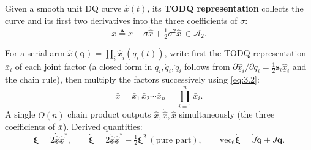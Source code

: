 Given a smooth unit DQ curve $\hat{\underline x}(t)$, its \textbf{TODQ representation} collects the curve and its first two derivatives into the three coefficients of $\sigma$:
\begin{equation}
\bar x\triangleq\hat{\underline x}+\sigma\dot{\hat{\underline x}}+\tfrac12\sigma^2\ddot{\hat{\underline x}}\ \in\mathcal A_2 .
\tag{3.3a}\label{eq:3.3a}
\end{equation}

For a serial arm $\hat{\underline x}(\boldsymbol q)=\prod_i\hat{\underline x}_i(q_i(t))$, write first the TODQ representation $\bar x_i$ of each joint factor (a closed form in $q_i,\dot q_i,\ddot q_i$ follows from $\partial\hat{\underline x}_i/\partial q_i=\tfrac12\boldsymbol s_i\hat{\underline x}_i$ and the chain rule), then multiply the factors successively using \eqref{eq:3.2}:
\begin{equation}
\bar x=\bar x_1\,\bar x_2\cdots\bar x_n=\prod_{i=1}^{n}\bar x_i .
\tag{3.4}\label{eq:3.4}
\end{equation}
A single $O(n)$ chain product outputs $\hat{\underline x},\dot{\hat{\underline x}},\ddot{\hat{\underline x}}$ simultaneously (the three coefficients of $\bar x$). Derived quantities:
\begin{equation}
\boldsymbol\xi=2\dot{\hat{\underline x}}\hat{\underline x}^*,\qquad
\dot{\boldsymbol\xi}=2\ddot{\hat{\underline x}}\hat{\underline x}^*-\tfrac12\boldsymbol\xi^2\ (\text{pure part}),\qquad
\mathrm{vec}_6\dot{\boldsymbol\xi}=\dot J\dot{\boldsymbol q}+J\ddot{\boldsymbol q}.
\tag{3.5}\label{eq:3.5}
\end{equation}
